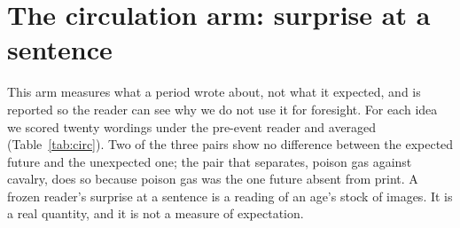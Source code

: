\documentclass[11pt]{article}
\begin{document}
\begin{table}[h]\centering\small

\caption{All questions the meter agreed to score, with the witness gate's decision and the screen's
verdict. The witness gate keeps a finding only if the witness puts at least half its money on the truth.}
\label{tab:gapsfull}
\end{table}

\section{The circulation arm: surprise at a sentence}\label{app:circulation}
This arm measures what a period wrote about, not what it expected, and is reported so the reader can see why
we do not use it for foresight. For each idea we scored twenty wordings under the pre-event reader and
averaged (Table~\ref{tab:circ}). Two of the three pairs show no difference between the expected future and
the unexpected one; the pair that separates, poison gas against cavalry, does so because poison gas was the
one future absent from print. A frozen reader's surprise at a sentence is a reading of an age's stock of
images. It is a real quantity, and it is not a measure of expectation.

\begin{table}[h]\centering\small

\caption{Surprise at a sentence, 1900 reader, twenty wordings per idea, in nats per word. Lower means less
surprising. Where the expected and unexpected futures score alike, the measure is reading what was printed,
not what was expected.}
\label{tab:circ}
\end{table}
\end{document}

